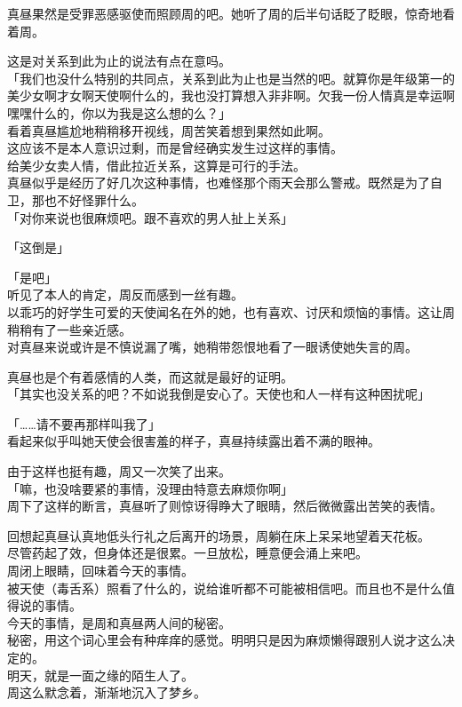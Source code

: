 真昼果然是受罪恶感驱使而照顾周的吧。她听了周的后半句话眨了眨眼，惊奇地看着周。

这是对关系到此为止的说法有点在意吗。\\

「我们也没什么特别的共同点，关系到此为止也是当然的吧。就算你是年级第一的美少女啊才女啊天使啊什么的，我也没打算想入非非啊。欠我一份人情真是幸运啊嘿嘿什么的，你以为我是这么想的么？」\\

看着真昼尴尬地稍稍移开视线，周苦笑着想到果然如此啊。\\

这应该不是本人意识过剩，而是曾经确实发生过这样的事情。\\

给美少女卖人情，借此拉近关系，这算是可行的手法。\\

真昼似乎是经历了好几次这种事情，也难怪那个雨天会那么警戒。既然是为了自卫，那也不好怪罪什么。\\

「对你来说也很麻烦吧。跟不喜欢的男人扯上关系」

「这倒是」

「是吧」\\

听见了本人的肯定，周反而感到一丝有趣。\\

以乖巧的好学生可爱的天使闻名在外的她，也有喜欢、讨厌和烦恼的事情。这让周稍稍有了一些亲近感。\\

对真昼来说或许是不慎说漏了嘴，她稍带怨恨地看了一眼诱使她失言的周。

真昼也是个有着感情的人类，而这就是最好的证明。\\

「其实也没关系的吧？不如说我倒是安心了。天使也和人一样有这种困扰呢」

「……请不要再那样叫我了」\\

看起来似乎叫她天使会很害羞的样子，真昼持续露出着不满的眼神。

由于这样也挺有趣，周又一次笑了出来。\\

「嘛，也没啥要紧的事情，没理由特意去麻烦你啊」\\

周下了这样的断言，真昼听了则惊讶得睁大了眼睛，然后微微露出苦笑的表情。\\

\vspace{2\baselineskip}

回想起真昼认真地低头行礼之后离开的场景，周躺在床上呆呆地望着天花板。\\

尽管药起了效，但身体还是很累。一旦放松，睡意便会涌上来吧。\\

周闭上眼睛，回味着今天的事情。\\

被天使（毒舌系）照看了什么的，说给谁听都不可能被相信吧。而且也不是什么值得说的事情。\\

今天的事情，是周和真昼两人间的秘密。\\

秘密，用这个词心里会有种痒痒的感觉。明明只是因为麻烦懒得跟别人说才这么决定的。\\

明天，就是一面之缘的陌生人了。\\

周这么默念着，渐渐地沉入了梦乡。
